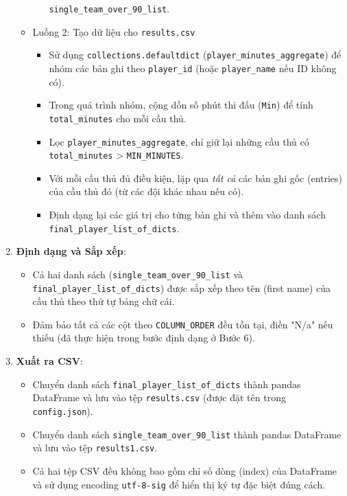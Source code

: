 \documentclass[12pt, a4paper]{report}
\begin{document}
\begin{enumerate}[label=\textbf{Bước \arabic*:}, leftmargin=*]
\begin{itemize}[leftmargin=0em]
\begin{itemize}
            \texttt{single\_team\_over\_90\_list}.
        \end{itemize}
        \item Luồng 2: Tạo dữ liệu cho \texttt{results.csv}
        \begin{itemize}
            \item Sử dụng \texttt{collections.defaultdict} (\texttt{player\_minutes\_aggregate}) để nhóm các bản ghi theo \texttt{player\_id} (hoặc \texttt{player\_name} nếu ID không có). 
            \item Trong quá trình nhóm, cộng dồn số phút thi đấu (\texttt{Min}) để tính \texttt{total\_minutes} cho mỗi cầu thủ.
            \item Lọc \texttt{player\_minutes\_aggregate}, chỉ giữ lại những cầu thủ có \texttt{total\_minutes} > \texttt{MIN\_MINUTES}.
            \item Với mỗi cầu thủ đủ điều kiện, lặp qua \textit{tất cả} các bản ghi gốc (entries) của cầu thủ đó (từ các đội khác nhau nếu có). 
            \item Định dạng lại các giá trị cho từng bản ghi và thêm vào danh sách \sloppypar \texttt{final\_player\_list\_of\_dicts}. 
        \end{itemize}
    \end{itemize}
    \item \textbf{Định dạng và Sắp xếp}:
    \begin{itemize}[leftmargin=0em]
        \item Cả hai danh sách (\texttt{single\_team\_over\_90\_list} và \texttt{final\_player\_list\_of\_dicts}) được sắp xếp theo tên (first name) của cầu thủ theo thứ tự bảng chữ cái. 
        \item Đảm bảo tất cả các cột theo \texttt{COLUMN\_ORDER} đều tồn tại, điền "N/a" nếu thiếu (đã thực hiện trong bước định dạng ở Bước 6).
    \end{itemize}
    \item \textbf{Xuất ra CSV}:
    \begin{itemize}[leftmargin=0em]
        \item Chuyển danh sách \texttt{final\_player\_list\_of\_dicts} thành pandas DataFrame và lưu vào tệp \texttt{results.csv} (được đặt tên trong \texttt{config.json}). 
        \item Chuyển danh sách \texttt{single\_team\_over\_90\_list} thành pandas DataFrame và lưu vào tệp \texttt{results1.csv}. 
        \item Cả hai tệp CSV đều không bao gồm chỉ số dòng (index) của DataFrame và sử dụng encoding \texttt{utf-8-sig} để hiển thị ký tự đặc biệt đúng cách. 
    \end{itemize}
\end{enumerate}
\end{document}
